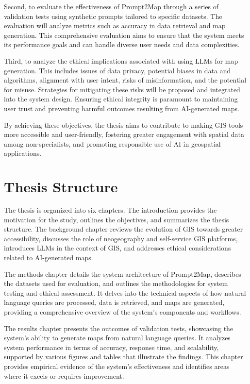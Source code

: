 Second, to evaluate the effectiveness of Prompt2Map through a series of validation tests using synthetic prompts tailored to specific datasets. The evaluation will analyze metrics such as accuracy in data retrieval and map generation. This comprehensive evaluation aims to ensure that the system meets its performance goals and can handle diverse user needs and data complexities.

Third, to analyze the ethical implications associated with using LLMs for map generation. This includes issues of data privacy, potential biases in data and algorithms, alignment with user intent, risks of misinformation, and the potential for misuse. Strategies for mitigating these risks will be proposed and integrated into the system design. Ensuring ethical integrity is paramount to maintaining user trust and preventing harmful outcomes resulting from AI-generated maps.

By achieving these objectives, the thesis aims to contribute to making GIS tools more accessible and user-friendly, fostering greater engagement with spatial data among non-specialists, and promoting responsible use of AI in geospatial applications.

\section{Thesis Structure}

The thesis is organized into six chapters. The introduction provides the motivation for the study, outlines the objectives, and summarizes the thesis structure. The background chapter reviews the evolution of GIS towards greater accessibility, discusses the role of neogeography and self-service GIS platforms, introduces LLMs in the context of GIS, and addresses ethical considerations related to AI-generated maps.

The methods chapter details the system architecture of Prompt2Map, describes the datasets used for evaluation, and outlines the methodologies for system testing and ethical assessment. It delves into the technical aspects of how natural language queries are processed, data is retrieved, and maps are generated, providing a comprehensive overview of the system's components and workflows.

The results chapter presents the outcomes of validation tests, showcasing the system's ability to generate maps from natural language queries. It analyzes system performance in terms of accuracy, response time, and scalability, supported by various figures and tables that illustrate the findings. This chapter provides empirical evidence of the system's effectiveness and identifies areas where it excels or requires improvement.

